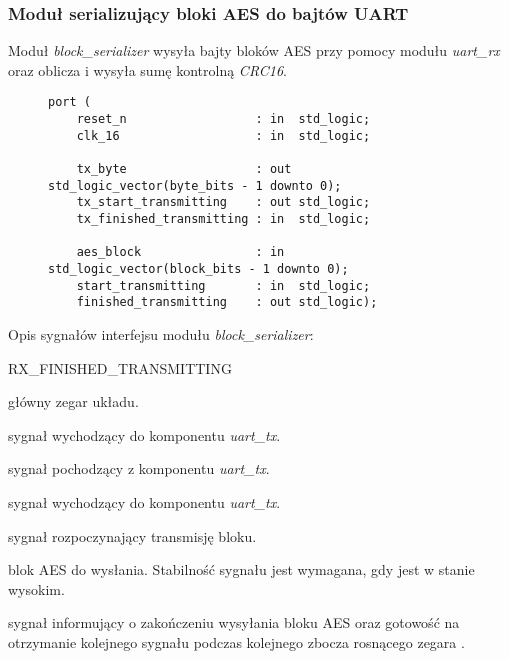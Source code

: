 \subsubsection{Moduł serializujący bloki AES do bajtów UART}
\label{sec:block-serializer}
Moduł \textit{block\_serializer} wysyła bajty bloków AES przy pomocy modułu \textit{uart\_rx} oraz oblicza i wysyła sumę kontrolną \textit{CRC16}.

\begin{figure}[!h]
\begin{lstlisting}[style=vhdl, captionpos=b, caption={\textit{block\_derializer} -- interfejs modułu}]
port (
	reset_n                  : in  std_logic;
	clk_16                   : in  std_logic;

	tx_byte                  : out std_logic_vector(byte_bits - 1 downto 0);
	tx_start_transmitting    : out std_logic;
	tx_finished_transmitting : in  std_logic;

	aes_block                : in  std_logic_vector(block_bits - 1 downto 0);
	start_transmitting       : in  std_logic;
	finished_transmitting    : out std_logic);
\end{lstlisting}
\end{figure}

Opis sygnałów interfejsu modułu \textit{block\_serializer}:
\begin{interface}{RX\_FINISHED\_TRANSMITTING}
	\item[\insignal{CLK\_16}] główny zegar układu.

	\item[\insignal{TX\_BYTE[7:0]}] sygnał wychodzący do komponentu \textit{uart\_tx}.
	\item[\outsignal{TX\_START\_TRANSMITTING}] sygnał pochodzący z komponentu \textit{uart\_tx}.
	\item[\insignal{TX\_FINISHED\_TRANSMITTING}] sygnał wychodzący do komponentu \textit{uart\_tx}.

	\item[\insignal{START\_TRANSMITTING}] sygnał rozpoczynający transmisję bloku.
	\item[\insignal{AES\_BLOCK[127:0]}] blok AES do wysłania. Stabilność sygnału jest wymagana, gdy  jest w stanie wysokim.
	\item[\outsignal{FINISHED\_TRANSMITTING}] sygnał informujący o zakończeniu wysyłania bloku AES oraz gotowość na otrzymanie kolejnego sygnału  podczas kolejnego zbocza rosnącego zegara .
\end{interface}

